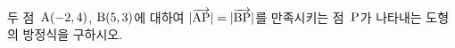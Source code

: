 두 점~$\mathrm{A}(-2{,}\mkern3mu\mathopen{}4)$, $\mathrm{B}(5{,}\mkern3mu\mathopen{}3)$에 대하여 $|\overrightarrow{\mathrm{AP}}|=|\overrightarrow{\mathrm{BP}}|$를 만족시키는 점~$\mathrm{P}$가 나타내는 도형의 방정식을 구하시오.
